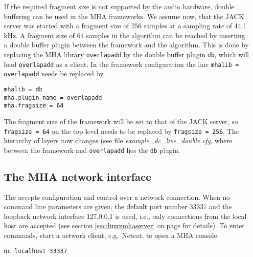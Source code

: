 If the required fragment size is not supported by the audio hardware,
double buffering can be used in the MHA frameworks. We assume now,
that the JACK server was started with a fragment size of 256 samples at
a sampling rate of 44.1 kHz. A fragment size of 64 samples in the algorithm 
can be reached by inserting a double buffer plugin between the framework and the algorithm. This is
done by replacing the MHA library \verb!overlapadd! by the double
buffer plugin \verb!db!, which will load \verb!overlapadd! as a
client. In the framework configuration the line \verb!mhalib = overlapadd! needs
be replaced by
\begin{verbatim}
mhalib = db
mha.plugin_name = overlapadd
mha.fragsize = 64
\end{verbatim}
The fragment size of the framework will be set to that of the JACK
server, so \verb!fragsize = 64! on the top level needs to be replaced by
\verb!fragsize = 256!. The hierarchy of layers now changes (see 
file \emph{example\_dc\_live\_double.cfg}, where between the framework 
and \verb!overlapadd! lies the \verb!db! plugin.


\subsection{The MHA network interface}%
\label{sec:example_network}%
%
%
The \mha{} accepts configuration and control over a network connection. 
%
When no command line parameters are given, the default port number
33337 and the loopback network interface 127.0.0.1 is used, i.e., only
connections from the local host are accepted (see section
\ref{sec:linuxmhaserver} on page \pageref{sec:linuxmhaserver} for
details).
%
To enter \mha{} commands, start a network client, e.g.\ Netcat, to
open a MHA console:
\begin{verbatim}nc localhost 33337\end{verbatim}

